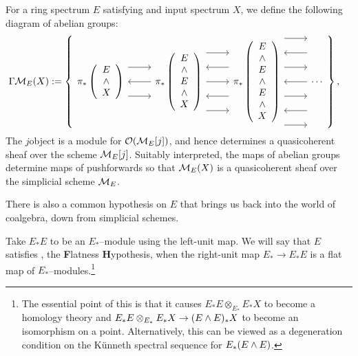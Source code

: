 \begin{definition}\label{DefnHomologyFunctorsValuedInSheaves}
For a ring spectrum $E$ satisfying {\CH} and input spectrum $X$, we define the following diagram of abelian groups:
\begin{align*}
\Gamma \context{E}(X) & := \left\{
\begin{tikzcd}[ampersand replacement=\&]
\pi_* \left( \begin{array}{c} E \\ \sm \\ X \end{array} \right) \arrow[leftarrow]{r} \arrow[shift left=(\baselineskip)]{r} \arrow[shift right=(\baselineskip)]{r} \&
\pi_* \left( \begin{array}{c} E \\ \sm \\ E \\ \sm \\ X \end{array} \right) \arrow[shift left=(2*\baselineskip)]{r} \arrow[leftarrow, shift left=(\baselineskip)]{r} \arrow[shift right=(2*\baselineskip)]{r} \arrow[leftarrow, shift right=(\baselineskip)]{r} \arrow{r} \&
\pi_* \left( \begin{array}{c} E \\ \sm \\ E \\ \sm \\ E \\ \sm \\ X \end{array} \right) \arrow[shift left=(3*\baselineskip)]{r} \arrow[leftarrow, shift left=(2*\baselineskip)]{r} \arrow[shift left=\baselineskip]{r} \arrow[leftarrow]{r} \arrow[shift right=\baselineskip]{r} \arrow[leftarrow, shift right=(2*\baselineskip)]{r} \arrow[shift right=(3*\baselineskip)]{r} \&
\cdots
\end{tikzcd}
\right\},
\end{align*}
The $j$\th object is a module for $\mathcal{O}(\mathcal{M}_{E}[j])$, and hence determines a quasicoherent sheaf over the scheme $\mathcal{M}_{E}[j]$.  Suitably interpreted, the maps of abelian groups determine maps of pushforwards so that $\mathcal{M}_{E}(X)$ is a quasicoherent sheaf over the simplicial scheme $\mathcal{M}_{E}$.
\end{definition}

There is also a common hypothesis on $E$ that brings us back into the world of coalgebra, down from simplicial schemes.
\begin{definition}
Take $E_* E$ to be an $E_*$--module using the left-unit map.  We will say that $E$ satisfies \FH, the \textbf Flatness \textbf Hypothesis, when the right-unit map $E_* \to E_* E$ is a flat map of $E_*$--modules.\footnote{The essential point of this is that it causes $E_* E \otimes_{E_*} E_* X$ to become a homology theory and $E_* E \otimes_{E_*} E_* X \to (E \wedge E)_* X$ to become an isomorphism on a point.  Alternatively, this can be viewed as a degeneration condition on the K\"unneth spectral sequence for $E_* (E \wedge E)$.}
\end{definition}

